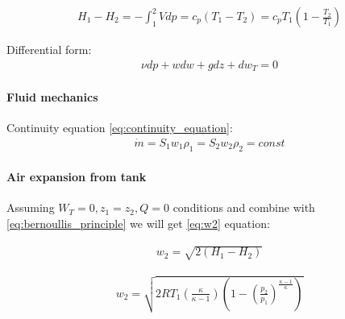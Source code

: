 \begin{align}
    H_1- H_2 = -\int_1^2 V dp = c_p(T_1-T_2) = c_p T_1(1-\frac{T_2}{T_1})
    \label{eq:etalpi_sub}
\end{align}

Differential form:
\begin{align}
    \nu dp + w dw + g dz + dw_T = 0
\end{align}


\paragraph{Fluid mechanics}
%

Continuity equation \ref{eq:continuity_equation}: 
\begin{align}
    \dot{m} = S_1 w_1 \rho_1 = S_2 w_2 \rho_2 = const
    \label{eq:continuity_equation}
\end{align}

\paragraph{Air expansion from tank}
Assuming $W_T = 0, z_1 = z_2, Q = 0$ conditions and combine with
\ref{eq:bernoullis_principle} we will get \ref{eq:w2} equation:

\begin{align}
    w_2 = \sqrt{2(H_1 - H_2)}
    \label{eq:w2}
\end{align}

\begin{align}
    w_2 =
    \sqrt{2RT_1(\frac{\kappa}{\kappa-1})(1-(\frac{p_2}{p_1})^\frac{\kappa-1}{\kappa})}
    \label{eq:w2_final}
\end{align}

